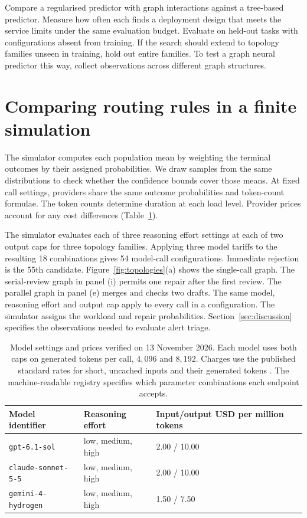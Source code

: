 \documentclass[11pt,reqno]{amsart}
\theoremstyle{definition}
\theoremstyle{remark}
\begin{document}
Compare a regularised predictor with graph interactions against a tree-based predictor. Measure how often each finds a deployment design that meets the service limits under the same evaluation budget. Evaluate on held-out tasks with configurations absent from training. If the search should extend to topology families unseen in training, hold out entire families. To test a graph neural predictor this way, collect observations across different graph structures.

\section{Comparing routing rules in a finite simulation}
\label{sec:simulation}
The simulator computes each population mean by weighting the terminal outcomes by their assigned probabilities. We draw samples from the same distributions to check whether the confidence bounds cover those means.
At fixed call settings, providers share the same outcome probabilities and token-count formulae. The token counts determine duration at each load level. Provider prices account for any cost differences (Table~\ref{tab:registry}).

The simulator evaluates each of three reasoning effort settings at each of two output caps for three topology families. Applying three model tariffs to the resulting 18 combinations gives 54 model-call configurations. Immediate rejection is the 55th candidate.
Figure~\ref{fig:topologies}(a) shows the single-call graph. The serial-review graph in panel (i) permits one repair after the first review. The parallel graph in panel (e) merges and checks two drafts.
The same model, reasoning effort and output cap apply to every call in a configuration. The simulator assigns the workload and repair probabilities. Section~\ref{sec:discussion} specifies the observations needed to evaluate alert triage.

\begin{table}[H]
\centering
\small
\begin{tabular}{lll}
\toprule
Model identifier & Reasoning effort & Input/output USD per million tokens\\
\midrule
\texttt{gpt-6.1-sol} & low, medium, high & 2.00 / 10.00\\
\texttt{claude-sonnet-5-5} & low, medium, high & 2.00 / 10.00\\
\texttt{gemini-4-hydrogen} & low, medium, high & 1.50 / 7.50\\
\bottomrule
\end{tabular}
\caption{Model settings and prices verified on 13 November 2026.
Each model uses both caps on generated tokens per call, $4{,}096$ and $8{,}192$.
Charges use the published standard rates for short, uncached inputs and their generated tokens
\cite{openaiSol2026,openaiDeploy2026,anthropicSonnet2026,googlePricing2026,googleHydrogen2026}.
The machine-readable registry specifies which parameter combinations each endpoint accepts.}
\label{tab:registry}
\end{table}
\end{document}
